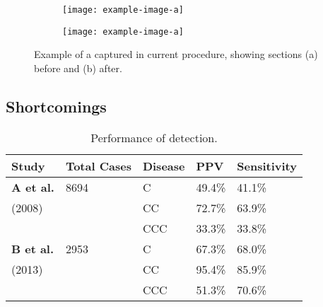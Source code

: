 \begin{figure}[ht]%
\begin{center}

  \begin{subfigure}[t]{.45\linewidth}
    \centering\texttt{[image: example-image-a]}
    \caption{}
  \end{subfigure}
   \begin{subfigure}[t]{.45\linewidth}
    \centering\texttt{[image: example-image-a]}
    \caption{}
  \end{subfigure}
  
  \caption{Example of a captured in current procedure, showing sections (a) before and (b) after.}
  \label{fig:diagnosis}
\end{center}
\end{figure}

\subsection{Shortcomings}
\label{sec:humanperf}
\par \blindtext



\begin{table}[H]
\centering
\caption{Performance of detection.}
\label{tabl:humanperf}
	\begin{tabular}{p{3cm} p{2cm} p{5cm} p{1cm} p{2cm}} 
 		\toprule
 		\textbf{Study} & \textbf{Total Cases} & \textbf{Disease} & 
 		\textbf{PPV} & \textbf{Sensitivity} \\
 		\midrule
 		\textbf{A et al.}  & 8694 &  C & 49.4\% & 41.1\% \\
 		 (2008) & & CC & 72.7\% & 63.9\% \\
 		 & & CCC & 33.3\% & 33.8\% \\
 		 \textbf{B et al.} & 2953  &  C& 67.3\% & 68.0\% \\
 		 (2013) & & CC & 95.4\% & 85.9\% \\
 		 & & CCC & 51.3\% & 70.6\% \\
 		\bottomrule %
	\end{tabular}
\end{table} 



